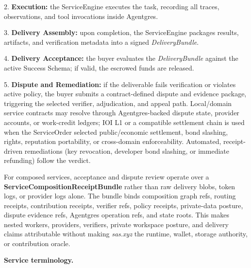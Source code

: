\documentclass[
  11pt,
]{article}
\begin{document}
2. \textbf{Execution:} the ServiceEngine executes the task, recording
all traces, observations, and tool invocations inside Agentgres.

3. \textbf{Delivery Assembly:} upon completion, the ServiceEngine
packages results, artifacts, and verification metadata into a signed
\emph{DeliveryBundle}.

4. \textbf{Delivery Acceptance:} the buyer evaluates the
\emph{DeliveryBundle} against the active Success Schema; if valid, the
escrowed funds are released.

5. \textbf{Dispute and Remediation:} if the deliverable fails
verification or violates active policy, the buyer submits a
contract-defined dispute and evidence package, triggering the selected
verifier, adjudication, and appeal path. Local/domain service contracts may resolve through
Agentgres-backed dispute state, provider accounts, or work-credit
ledgers; IOI L1 or a compatible settlement chain is used when the
ServiceOrder selected public/economic settlement, bond slashing, rights,
reputation portability, or cross-domain enforceability. Automated,
receipt-driven remediations (key revocation, developer bond slashing, or
immediate refunding) follow the verdict.

For composed services, acceptance and dispute review operate over a
\textbf{ServiceCompositionReceiptBundle} rather than raw delivery blobs,
token logs, or provider logs alone. The bundle binds composition graph
refs, routing receipts, contribution receipts, verifier refs, policy
receipts, private-data posture, dispute evidence refs, Agentgres
operation refs, and state roots. This makes nested workers, providers,
verifiers, private workspace posture, and delivery claims attributable
without making \emph{sas.xyz} the runtime, wallet, storage authority, or
contribution oracle.

\textbf{Service terminology.}
\end{document}
